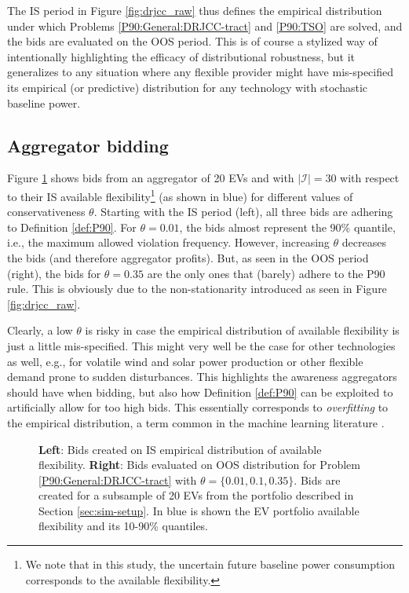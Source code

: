 \documentclass[conference]{IEEEtran}
\begin{document}
The \ac{IS} period in Figure \ref{fig:drjcc_raw} thus defines the empirical distribution under which Problems \eqref{P90:General:DRJCC-tract} and \eqref{P90:TSO} are solved, and the bids are evaluated on the \ac{OOS} period. This is of course a stylized way of intentionally highlighting the efficacy of distributional robustness, but it generalizes to any situation where any flexible provider might have mis-specified its empirical (or predictive) distribution for any technology with stochastic baseline power.

\subsection{Aggregator bidding}

Figure \ref{fig:drjcc_bids} shows bids from an aggregator of 20 \acp{EV} and with $|\mathcal{I}| = 30$ with respect to their \ac{IS} available flexibility\footnote{We note that in this study, the uncertain future baseline power consumption corresponds to the available flexibility.} (as shown in blue) for different values of conservativeness $\theta$. Starting with the \ac{IS} period (left), all three bids are adhering to Definition \ref{def:P90}. For $\theta = 0.01$, the bids almost represent the 90\% quantile, i.e., the maximum allowed violation frequency. However, increasing $\theta$ decreases the bids (and therefore aggregator profits). But, as seen in the \ac{OOS} period (right), the bids for $\theta = 0.35$ are the only ones that (barely) adhere to the P90 rule. This is obviously due to the non-stationarity introduced as seen in Figure \ref{fig:drjcc_raw}.

Clearly, a low $\theta$ is risky in case the empirical distribution of available flexibility is just a little mis-specified. This might very well be the case for other technologies as well, e.g., for volatile wind and solar power production or other flexible demand prone to sudden disturbances. This highlights the awareness aggregators should have when bidding, but also how Definition \ref{def:P90} can be exploited to artificially allow for too high bids. This essentially corresponds to \textit{overfitting} to the empirical distribution, a term common in the machine learning literature \cite{bishop2006pattern}.

\begin{figure}[!t]
    \centering
    \begin{adjustbox}{width=\columnwidth}
        
    \end{adjustbox}
    \caption{\textbf{Left}: Bids created on \ac{IS} empirical distribution of available flexibility. \textbf{Right}: Bids evaluated on \ac{OOS} distribution for Problem \eqref{P90:General:DRJCC-tract} with $\theta = \{0.01, 0.1, 0.35\}$. Bids are created for a subsample of 20 \acp{EV} from the portfolio described in Section \ref{sec:sim-setup}. In blue is shown the \ac{EV} portfolio available flexibility and its 10-90\% quantiles.}
    \label{fig:drjcc_bids}
\end{figure}
\end{document}
